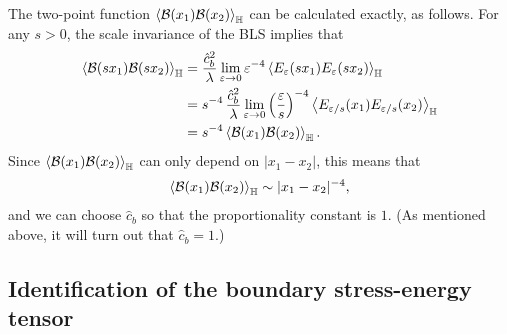 \documentclass[a4paper,11pt]{article}
\begin{document}
\medskip


The two-point function $\Braket{{\mathcal B}(x_1){\mathcal B}(x_2)}_{\mathbb H}$ can be calculated exactly, as follows. For any $s>0$, the scale invariance of the BLS implies that
\begin{align}
\begin{split} \label{eq:scaling-two-point-func}
    \Braket{{\mathcal B}(sx_1){\mathcal B}(sx_2)}_{\mathbb H} &= \frac{\hat{c}_b^2}{\lambda} \lim_{\varepsilon \to 0} \varepsilon^{-4} \Braket{ E_{\varepsilon}(sx_1) E_{\varepsilon}(sx_2) }_{\mathbb{H}} \\
    &= s^{-4} \, \frac{\hat{c}_b^2}{\lambda} \lim_{\varepsilon \to 0} \left(\frac{\varepsilon}{s}\right)^{-4} \Braket{ E_{\varepsilon/s}(x_1) E_{\varepsilon/s}(x_2) }_{\mathbb{H}}\\
    &= s^{-4} \Braket{{\mathcal B}(x_1){\mathcal B}(x_2)}_{\mathbb H}.
\end{split}
\end{align}
Since $\Braket{{\mathcal B}(x_1){\mathcal B}(x_2)}_{\mathbb H}$ can only depend on $|x_1-x_2|$, this means that
\begin{align}
    \Braket{{\mathcal B}(x_1){\mathcal B}(x_2)}_{\mathbb H} \sim |x_1-x_2|^{-4},
\end{align}
and we can choose $\hat{c}_b$ so that the proportionality constant is $1$. (As mentioned above, it will turn out that $\hat{c}_b=1$.)


\subsection{Identification of the boundary stress-energy tensor} \label{sec:boundary-stress-energy-tensor}
\end{document}
